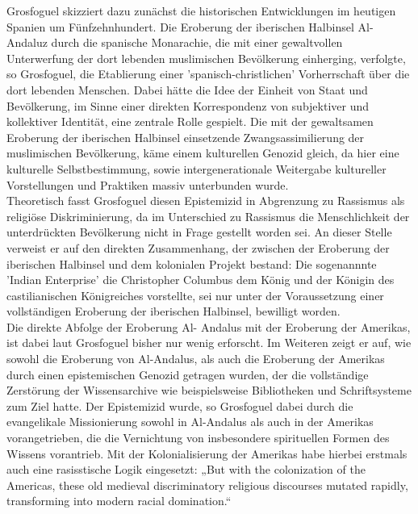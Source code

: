 \noindent Grosfoguel skizziert dazu zunächst die historischen Entwicklungen im heutigen
Spanien um Fünfzehnhundert. Die Eroberung der iberischen Halbinsel Al-Andaluz
durch die spanische Monarachie, die mit einer gewaltvollen Unterwerfung der
dort lebenden muslimischen Bevölkerung einherging, verfolgte, so Grosfoguel,
die Etablierung einer 'spanisch-christlichen' Vorherrschaft über die dort
lebenden Menschen. Dabei hätte die Idee der Einheit von Staat und Bevölkerung,
im Sinne einer direkten Korrespondenz von subjektiver und kollektiver
Identität, eine zentrale Rolle gespielt.\footnotemark
{} Die mit
der gewaltsamen Eroberung der iberischen Halbinsel einsetzende
Zwangsassimilierung der muslimischen Bevölkerung, käme einem kulturellen
Genozid gleich, da hier eine kulturelle Selbstbestimmung, sowie
intergenerationale Weitergabe kultureller Vorstellungen und Praktiken massiv
unterbunden wurde.\footnotemark {}\\

\noindent Theoretisch fasst Grosfoguel diesen Epistemizid in Abgrenzung zu Rassismus als
religiöse Diskriminierung, da im Unterschied zu Rassismus die Menschlichkeit
der unterdrückten Bevölkerung nicht in Frage gestellt worden sei.\footnotemark
{} An dieser Stelle verweist er auf den direkten Zusammenhang, der zwischen der Eroberung
der iberischen Halbinsel und dem kolonialen Projekt bestand: Die sogenannnte
'Indian Enterprise' die Christopher Columbus dem König und der Königin des
castilianischen Königreiches vorstellte, sei nur unter der Voraussetzung einer
vollständigen Eroberung der iberischen Halbinsel, bewilligt worden.\\

\noindent Die direkte Abfolge der Eroberung Al- Andalus mit der Eroberung der Amerikas,
ist dabei laut Grosfoguel bisher nur wenig erforscht.\footnotemark
{} Im Weiteren zeigt er
auf, wie sowohl die Eroberung von Al-Andalus, als auch die Eroberung der
Amerikas durch einen epistemischen Genozid getragen wurden, der die
vollständige Zerstörung der Wissensarchive wie beispielsweise Bibliotheken und
Schriftsysteme zum Ziel hatte.\footnotemark
{}  Der Epistemizid wurde, so Grosfoguel dabei
durch die evangelikale Missionierung sowohl in Al-Andalus als auch in der
Amerikas vorangetrieben, die die Vernichtung von insbesondere spirituellen
Formen des Wissens vorantrieb. Mit der Kolonialisierung der Amerikas habe
hierbei erstmals auch eine rasisstische Logik eingesetzt: „But with the
colonization of the Americas, these old medieval discriminatory religious
discourses mutated rapidly, transforming into modern racial domination.“
\footnotemark {}\\

